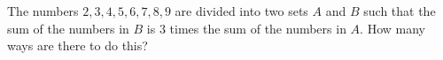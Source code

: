 The numbers \(2,3,4,5,6,7,8,9\) are divided into two sets \(A\) and \(B\) such that the sum of the numbers in \(B\) is \(3\) times the sum of the numbers in \(A\). How many ways are there to do this?
